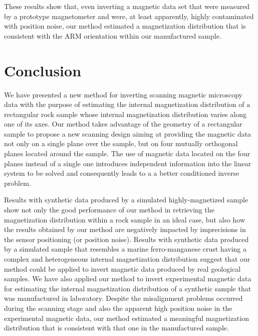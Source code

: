 \documentclass[galley,gc]{agutex}
\begin{document}
\begin{article}
These results show that, even inverting a magnetic data set that
were measured by a prototype magnetometer and were, at least apparently,
highly contaminated with position noise, our method estimated a 
magnetization distribution that is consistent with the ARM orientation
within our manufactured sample.

\section{Conclusion}

We have presented a new method for inverting scanning magnetic
microscopy data with the purpose of estimating the internal 
magnetization distribution of a rectangular rock sample whose
internal magnetization distribution varies along one of its
axes.
Our method takes advantage of the geometry of a rectangular sample
to propose a new scanning design aiming at providing the magnetic
data not only on a single plane over the sample, but on four 
mutually orthogonal planes located around the sample.
The use of magnetic data located on the four planes instead
of a single one introduces independent information into the
linear system to be solved and consequently leads to a
a better conditioned inverse problem.

Results with synthetic data produced by a simulated highly-magnetized 
sample show not only the good performance of 
our method in retrieving the magnetization distribution within a 
rock sample in an ideal case, but also how the results obtained by our 
method are negatively impacted by imprecisions in the sensor positioning
(or position noise).
Results with synthetic data produced by a simulated sample that 
resembles a marine ferro-manganese crust having a complex and heterogeneous 
internal magnetization distribution suggest that our method could be
applied to invert magnetic data produced by real geological samples.
We have also applied our method to invert experimental magnetic data
for estimating the internal magnetization 
distribution of a synthetic sample that was manufactured in 
laboratory.
Despite the misalignment problems occurred during the scanning stage
and also the apparent high position noise in the experimental magnetic
data, our method estimated a meaningful magnetization distribution that 
is consistent with that one in the manufactured sample.


\end{article}
\end{document}
